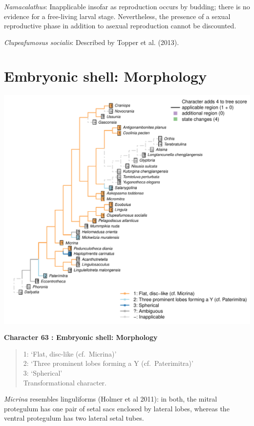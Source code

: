 \documentclass[]{book}
\theoremstyle{definition}
\theoremstyle{definition}
\theoremstyle{definition}
\theoremstyle{remark}
\begin{document}
\emph{Namacalathus}: Inapplicable insofar as reproduction occurs by
budding; there is no evidence for a free-living larval stage.
Nevertheless, the presence of a sexual reproductive phase in addition to
asexual reproduction cannot be discounted.

\emph{Clupeafumosus socialis}: Described by Topper et al. (2013).

\hypertarget{embryonic-shell-morphology}{%
\section*{Embryonic shell:
Morphology}\label{embryonic-shell-morphology}}

\includegraphics{Brachiopod_phylogeny_files/figure-latex/unnamed-chunk-5-63.pdf}

\textbf{Character 63 : Embryonic shell: Morphology }

\begin{quote}
1: `Flat, disc-like (cf.~Micrina)'\\
2: `Three prominent lobes forming a Y (cf.~Paterimitra)'\\
3: `Spherical'\\
Transformational character.
\end{quote}

\emph{Micrina} resembles linguliforms (Holmer et al 2011): in both, the
mitral protegulum has one pair of setal sacs enclosed by lateral lobes,
whereas the ventral protegulum has two lateral setal tubes.
\end{document}
